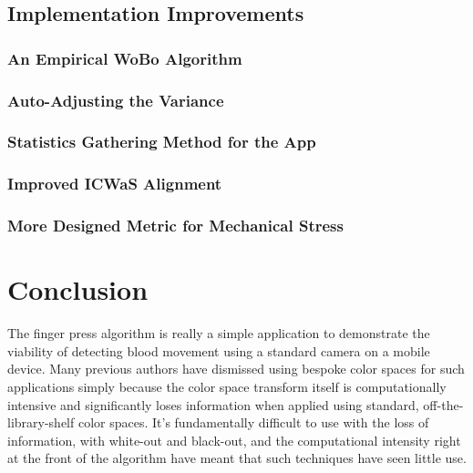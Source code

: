 \subsection{Implementation Improvements}\label{sec:ImplementationImprovements}

\subsubsection{An Empirical WoBo Algorithm}\label{sec:EmpicialWoBoAlgorithm}

\subsubsection{Auto-Adjusting the Variance}\label{sec:AutoAdjustingTheVariance}

\subsubsection{Statistics Gathering Method for the App}\label{sec:StatisticsGatheringMethod}

\subsubsection{Improved ICWaS Alignment}\label{sec:ImprovedICWaSAlignment}

\subsubsection{More Designed Metric for Mechanical Stress}\label{sec:MoreDesignedMetricforMechanicalStress}


\section{Conclusion}\label{sec:ConclusionCh5}

The finger press algorithm is really a simple application to demonstrate the viability of detecting blood movement using a standard camera on a mobile device. Many previous authors have dismissed using bespoke color spaces for such applications simply because the color space transform itself is computationally intensive and significantly loses information when applied using standard, off-the-library-shelf color spaces. It's fundamentally difficult to use with the loss of information, with white-out and black-out, and the computational intensity right at the front of the algorithm have meant that such techniques have seen little use.

